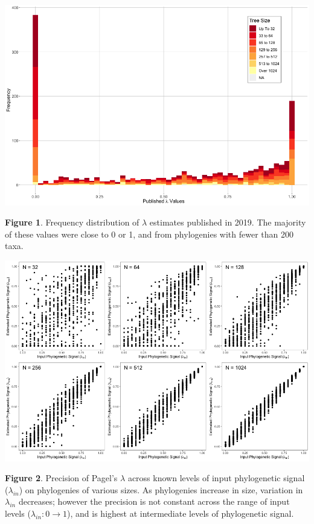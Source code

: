 \documentclass[
]{article}
\begin{document}
\newpage

\includegraphics[width=0.95\linewidth]{Fig1}

\singlespacing \textbf{Figure 1}. Frequency distribution of \(\lambda\)
estimates published in 2019. The majority of these values were close to
0 or 1, and from phylogenies with fewer than 200 taxa.

\newpage

\includegraphics[width=0.95\linewidth]{Fig2}

\singlespacing \textbf{Figure 2}. Precision of Pagel's \(\lambda\)
across known levels of input phylogenetic signal (\(\lambda_{in}\)) on
phylogenies of various sizes. As phylogenies increase in size, variation
in \(\lambda_{in}\) decreases; however the precision is not constant
across the range of input levels (\(\lambda_{in}: 0 \to 1\)), and is
highest at intermediate levels of phylogenetic signal.

\newpage
\end{document}
